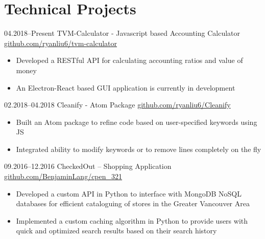 \documentclass[]{cv-style}          %
\begin{document}

\section{Technical Projects}

\begin{entrylist}
\entry
  {04.2018--Present}
  {TVM-Calculator - Javascript based Accounting Calculator}
  {\href{https://github.com/ryanliu6/tvm-calculator}{github.com/ryanliu6/tvm-calculator}}
  {
  \begin{itemize}[leftmargin=*]
    \item Developed a RESTful API for calculating accounting ratios and value of money
    \item An Electron-React based GUI application is currently in development
  \end{itemize}}
\entry
  {02.2018--04.2018}
  {Cleanify - Atom Package}
  {\href{https://github.com/ryanliu6/Cleanify}{github.com/ryanliu6/Cleanify}}
  {
  \begin{itemize}[leftmargin=*]
    \item Built an Atom package to refine code based on user-specified keywords using JS
    \item Integrated ability to modify keywords or to remove lines completely on the fly
  \end{itemize}}
\entry
  {09.2016--12.2016}
  {CheckedOut – Shopping Application}
  {\href{https://github.com/BenjaminLang/cpen_321}{github.com/BenjaminLang/cpen\_321}}
  {
  \begin{itemize}[leftmargin=*]
    \item Developed a custom API in Python to interface with MongoDB NoSQL databases for efficient cataloguing of stores in the Greater Vancouver Area
    \item Implemented a custom caching algorithm in Python to provide users with quick and optimized search results based on their search history
  \end{itemize}}

\end{entrylist}
\end{document}
